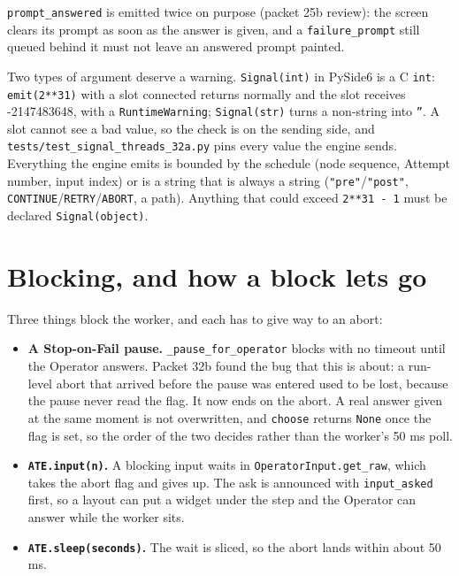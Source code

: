 \texttt{prompt\_answered} is emitted twice on purpose (packet 25b review): the screen clears its prompt
as soon as the answer is given, and a \texttt{failure\_prompt} still queued behind it must not leave an
answered prompt painted.

Two types of argument deserve a warning. \texttt{Signal(int)} in PySide6 is a C \texttt{int}:
\texttt{emit(2**31)} with a slot connected returns normally and the slot receives -2147483648, with a
\texttt{RuntimeWarning}; \texttt{Signal(str)} turns a non-string into \texttt{''}. A slot cannot see a
bad value, so the check is on the sending side, and
\texttt{tests/\allowbreak{}test\_\allowbreak{}signal\_\allowbreak{}threads\_\allowbreak32a.py} pins every value the engine sends. Everything the engine
emits is bounded by the schedule (node sequence, Attempt number, input index) or is a string that is
always a string (\texttt{"pre"}/\texttt{"post"}, \texttt{CONTINUE}/\texttt{RETRY}/\texttt{ABORT}, a
path). Anything that could exceed \texttt{2**31 - 1} must be declared \texttt{Signal(object)}.

\section{Blocking, and how a block lets go}

Three things block the worker, and each has to give way to an abort:

\begin{itemize}
  \item \textbf{A Stop-on-Fail pause.} \texttt{\_\allowbreak{}pause\_\allowbreak{}for\_\allowbreak{}operator} blocks with no timeout until the
    Operator answers. Packet 32b found the bug that this is about: a run-level abort that arrived before
    the pause was entered used to be lost, because the pause never read the flag. It now ends on the
    abort. A real answer given at the same moment is not overwritten, and \texttt{choose} returns
    \texttt{None} once the flag is set, so the order of the two decides rather than the worker's 50 ms
    poll.
  \item \textbf{\texttt{ATE.input(n)}.} A blocking input waits in \texttt{OperatorInput.get\_\allowbreak{}raw}, which
    takes the abort flag and gives up. The ask is announced with \texttt{input\_asked} first, so a layout
    can put a widget under the step and the Operator can answer while the worker sits.
  \item \textbf{\texttt{ATE.sleep(seconds)}.} The wait is sliced, so the abort lands within about 50 ms.
\end{itemize}

